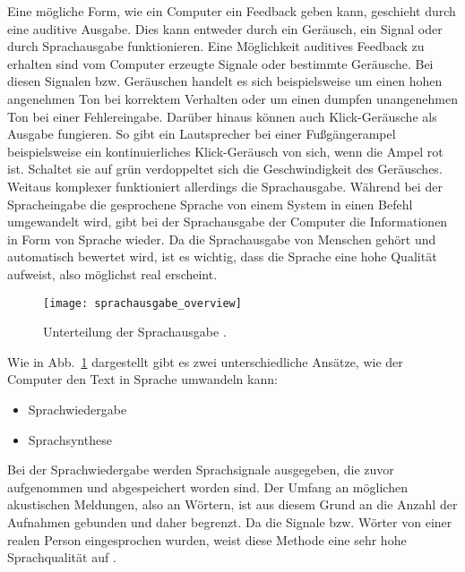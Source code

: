 Eine mögliche Form, wie ein Computer ein Feedback geben kann, geschieht durch eine auditive Ausgabe. Dies kann entweder durch ein Geräusch, ein Signal oder durch Sprachausgabe funktionieren.
\newline \newline
Eine Möglichkeit auditives Feedback zu erhalten sind vom Computer erzeugte Signale oder bestimmte Geräusche. Bei diesen Signalen bzw. Geräuschen handelt es sich beispielsweise um einen hohen angenehmen Ton bei korrektem Verhalten oder um einen dumpfen unangenehmen Ton bei einer Fehlereingabe. Darüber hinaus können auch \zB Klick-Geräusche als Ausgabe fungieren. So gibt ein Lautsprecher bei einer Fußgängerampel beispielsweise ein kontinuierliches Klick-Geräusch von sich, wenn die Ampel rot ist. Schaltet sie auf grün verdoppeltet sich die Geschwindigkeit des Geräusches.
\newline \newline
Weitaus komplexer funktioniert allerdings die Sprachausgabe. Während bei der Spracheingabe die gesprochene Sprache von einem System in einen Befehl umgewandelt wird, gibt bei der Sprachausgabe der Computer die Informationen in Form von Sprache wieder. Da die Sprachausgabe von Menschen gehört und automatisch bewertet wird, ist es wichtig, dass die Sprache eine hohe Qualität aufweist, also möglichst real erscheint. 
\begin{figure}
\centering
\texttt{[image: sprachausgabe\_overview]}
\caption{Unterteilung der Sprachausgabe \cite{FellbaumSprache}.}
\label{fig:SprachausgabeOverview}
\end{figure}
\newline \newline
Wie in Abb.~\ref{fig:SprachausgabeOverview} dargestellt gibt es zwei unterschiedliche Ansätze, wie der Computer den Text in Sprache umwandeln kann:
\begin{itemize}
      \item Sprachwiedergabe
      \item Sprachsynthese
\end{itemize}
\vspace{\baselineskip}
Bei der Sprachwiedergabe werden Sprachsignale ausgegeben, die zuvor aufgenommen und abgespeichert worden sind. Der Umfang an möglichen akustischen Meldungen, also an Wörtern, ist aus diesem Grund an die Anzahl der Aufnahmen gebunden und daher begrenzt. Da die Signale bzw. Wörter von einer realen Person eingesprochen wurden, weist diese Methode eine sehr hohe Sprachqualität auf \cite{KaufmannPfisterSprache}.

